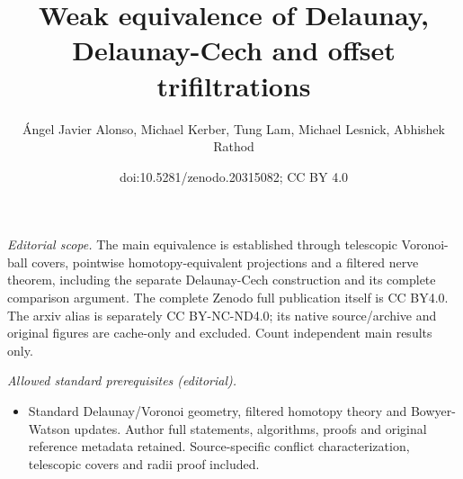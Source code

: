 \documentclass[11pt]{amsart}
\title{Weak equivalence of Delaunay, Delaunay-Cech and offset trifiltrations}
\author{Ángel Javier Alonso, Michael Kerber, Tung Lam, Michael Lesnick, Abhishek Rathod}
\date{doi:10.5281/zenodo.20315082; CC BY 4.0}
\theoremstyle{plain}
\theoremstyle{definition}
\theoremstyle{remark}
\begin{document}
\maketitle
\noindent\textit{Editorial scope.} The main equivalence is established through telescopic Voronoi-ball covers, pointwise homotopy-equivalent projections and a filtered nerve theorem, including the separate Delaunay-Cech construction and its complete comparison argument. The complete Zenodo full publication itself is CC BY4.0. The arxiv alias is separately CC BY-NC-ND4.0; its native source/archive and original figures are cache-only and excluded. Count independent main results only.\par\medskip
\noindent\textit{Allowed standard prerequisites (editorial).}\begin{itemize}
\item Standard Delaunay/Voronoi geometry, filtered homotopy theory and Bowyer-Watson updates. Author full statements, algorithms, proofs and original reference metadata retained. Source-specific conflict characterization, telescopic covers and radii proof included.
\end{itemize}\medskip
\end{document}
